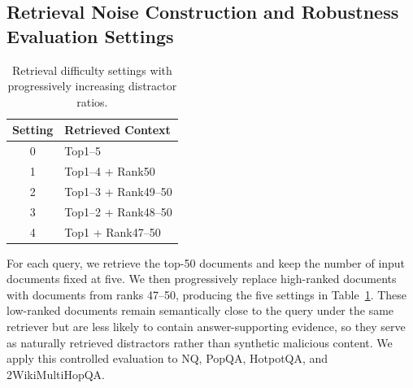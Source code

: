 \documentclass[11pt]{article}
\begin{document}
\subsection{Retrieval Noise Construction and Robustness Evaluation Settings}
\begin{table}[b]
  \centering
  \caption{Retrieval difficulty settings with progressively increasing distractor ratios.}
  \label{tab:noise_setting}
  \setlength{\tabcolsep}{15pt}
  \renewcommand{\arraystretch}{1.1}
  \begin{tabular}{cl}
  \toprule
  \textbf{Setting} & \textbf{Retrieved Context} \\
  \midrule
  0 & Top1--5 \\
  1 & Top1--4 + Rank50 \\
  2 & Top1--3 + Rank49--50 \\
  3 & Top1--2 + Rank48--50 \\
  4 & Top1 + Rank47--50 \\
  \bottomrule
  \end{tabular}
\end{table}
\label{sec:noise_setting}
For each query, we retrieve the top-50 documents and keep the number of input documents fixed at five. We then progressively replace high-ranked documents with documents from ranks 47--50, producing the five settings in Table~\ref{tab:noise_setting}. These low-ranked documents remain semantically close to the query under the same retriever but are less likely to contain answer-supporting evidence, so they serve as naturally retrieved distractors rather than synthetic malicious content. We apply this controlled evaluation to NQ, PopQA, HotpotQA, and 2WikiMultiHopQA.
\end{document}
